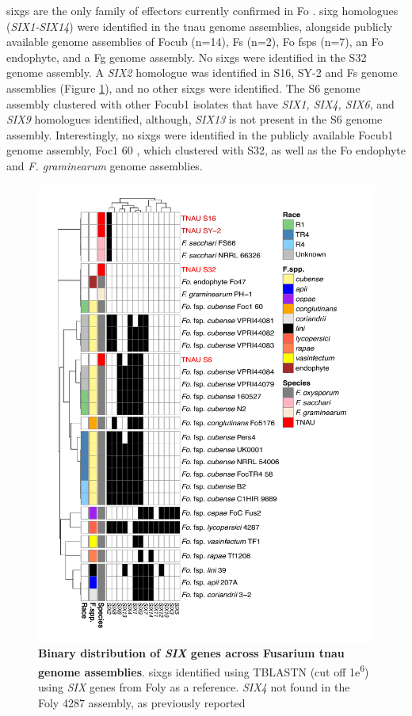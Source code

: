 \Acfp{sixg} are the only family of effectors currently confirmed in \ac{Fo} \parencite{Armitage2018, Czislowski2018}. \Ac{sixg} homologues (\textit{SIX1-SIX14}) were identified in the \ac{tnau} genome assemblies, alongside publicly available genome assemblies of \ac{Focub} (n=14), \ac{Fs} (n=2), \ac{Fo} \acp{fsp} (n=7), an \ac{Fo} endophyte, and a \acl{Fg} genome assembly. No \acp{sixg} were identified in the S32 genome assembly. A \textit{SIX2} homologue was identified in S16, SY-2  and  \ac{Fs} genome assemblies (Figure \ref{fig:SixTNAU}), and no other \acp{sixg} were identified. The S6 genome assembly clustered with other \ac{Focub1} isolates that have \textit{SIX1, SIX4, SIX6}, and \textit{SIX9} homologues identified, although, \textit{SIX13} is not present in the S6 genome assembly. Interestingly, no \acp{sixg} were identified in the publicly available \ac{Focub1} genome assembly, Foc1 60 \parencite{Yun2019}, which clustered with S32, as well as the \ac{Fo} endophyte and \textit{F. graminearum} genome assemblies. 

\begin{figure}[htp!]
  \centering
  \includegraphics[width=15cm]{Figures/SIX_Heatmap.pdf}
  \caption[Binary distribution of \textit{SIX} genes across Fusarium tnau genome assemblies]{\textbf{Binary distribution of \textit{SIX} genes across Fusarium tnau genome assemblies}. \aclp{sixg} identified using TBLASTN (cut off 1\-e\textsuperscript{6}) using \textit{SIX} genes from \acl{Foly} as a reference. \textit{SIX4} not found in the \acl{Foly} 4287 assembly, as previously reported \parencite{Czislowski2018}}
  \label{fig:SixTNAU}
\end{figure}

